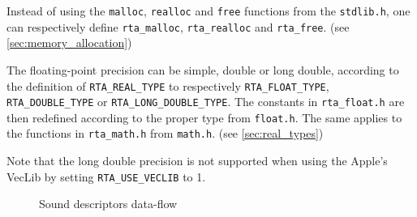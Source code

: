 \documentclass[a4paper, twoside]{article}
\begin{document}
Instead of using the \texttt{malloc}, \texttt{realloc} and
\texttt{free} functions from the \texttt{stdlib.h}, one can
respectively define \texttt{rta\_malloc}, \texttt{rta\_realloc}
and \texttt{rta\_free}. (see \ref{sec:memory_allocation})

The floating-point precision can be simple, double or long double,
according to the definition of \texttt{RTA\_REAL\_TYPE} to
respectively \texttt{RTA\_FLOAT\_TYPE}, \texttt{RTA\_DOUBLE\_TYPE} or
\texttt{RTA\_LONG\_DOUBLE\_TYPE}. The constants in
\texttt{rta\_float.h} are then redefined according to the proper type
from \texttt{float.h}. The same applies to the functions in
\texttt{rta\_math.h} from \texttt{math.h}. (see \ref{sec:real_types})

Note that the long double precision is not supported when using the
Apple's VecLib by setting \texttt{RTA\_USE\_VECLIB} to 1.


\begin{figure}[!hbt]
  \centering
  \caption[Sound descriptors data-flow]{Sound descriptors data-flow}
  \label{fig:dataflow}
\end{figure}
\end{document}
